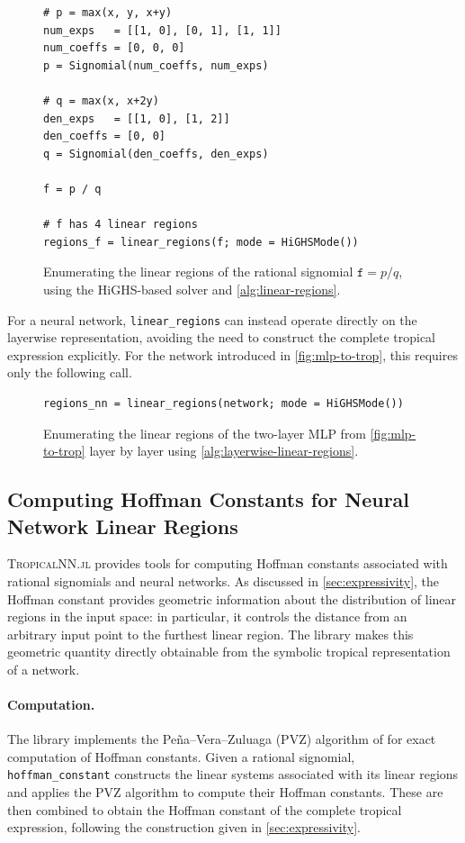 \documentclass[10pt]{article}
\theoremstyle{definition}
\theoremstyle{remark}
\begin{document}
\begin{figure}[H]
\begin{lstlisting}
# p = max(x, y, x+y)
num_exps   = [[1, 0], [0, 1], [1, 1]]
num_coeffs = [0, 0, 0]
p = Signomial(num_coeffs, num_exps)

# q = max(x, x+2y)
den_exps   = [[1, 0], [1, 2]]
den_coeffs = [0, 0]
q = Signomial(den_coeffs, den_exps)

f = p / q

# f has 4 linear regions
regions_f = linear_regions(f; mode = HiGHSMode())
\end{lstlisting}
\caption{Enumerating the linear regions of the rational signomial $\mathtt{f} = p/q$, using the HiGHS-based solver and \cref{alg:linear-regions}.}
\label{fig:linear-regions-rat}
\end{figure}

For a neural network, \texttt{linear\_regions} can instead operate directly on the layerwise representation, avoiding the need to construct the complete tropical expression explicitly. For the network introduced in \cref{fig:mlp-to-trop}, this requires only the following call.

\begin{figure}[H]
\begin{lstlisting}
regions_nn = linear_regions(network; mode = HiGHSMode())
\end{lstlisting}
\caption{Enumerating the linear regions of the two-layer MLP from
\cref{fig:mlp-to-trop} layer by layer using \cref{alg:layerwise-linear-regions}.}
\label{fig:linear-regions-mlp}
\end{figure}

\subsection{Computing Hoffman Constants for Neural Network Linear Regions}\label{sec:pena_alg}

\textsc{TropicalNN.jl} provides tools for computing Hoffman constants associated with rational signomials and neural networks. As discussed in \cref{sec:expressivity}, the Hoffman constant provides geometric information about the distribution of linear regions in the input space: in particular, it controls the distance from an arbitrary input point to the furthest linear region. The library makes this geometric quantity directly obtainable from the symbolic tropical representation of a network.

\paragraph{Computation.} The library implements the Pe\~na--Vera--Zuluaga (PVZ) algorithm of \cite{pena2018algorithm} for exact computation of Hoffman constants. Given a rational signomial, \texttt{hoffman\_constant} constructs the linear systems associated with its linear regions and applies the PVZ
algorithm to compute their Hoffman constants. These are then combined to obtain the Hoffman constant of the complete tropical expression, following the construction given in \cref{sec:expressivity}.
\end{document}
